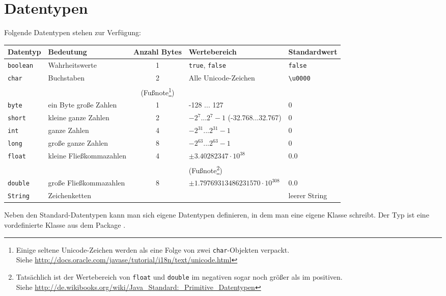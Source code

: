 \section{Datentypen}

Folgende Datentypen stehen zur Verfügung:

\begin{savenotes}
\begin{tabular}{|l|l|c|l|l|}\hline
\textbf{Datentyp} & \textbf{Bedeutung} & \textbf{Anzahl Bytes} &
\textbf{Wertebereich} & \textbf{Standardwert}
\\ \hline
{\lstinline|boolean|} & Wahrheitswerte & 1 & {\lstinline|true|},
{\lstinline|false|} & {\lstinline|false|} 
\\ \hline
{\lstinline|char|} & Buchstaben & 2 & Alle Unicode-Zeichen &
{\lstinline|\u0000|} 
\\
&&(Fußnote\footnote{Einige seltene Unicode-Zeichen werden als eine Folge von
zwei \texttt{char}-Objekten verpackt.\\ Siehe
\url{http://docs.oracle.com/javase/tutorial/i18n/text/unicode.html}})&&
\\
\hline {\lstinline|byte|} & ein Byte große Zahlen & 1 & -128 ... 127 & 0 
\\ \hline
{\lstinline|short|} & kleine ganze Zahlen & 2 & $-2^{7} ... 2^{7}-1$
(-32.768...32.767) & 0 \\ \hline
{\lstinline|int|} & ganze Zahlen & 4 & $-2^{31} ... 2^{31}-1$ & 0 
\\ \hline 
{\lstinline|long|} & große ganze Zahlen & 8 & $-2^{63} ... 2^{63}-1$ & 0
\\ \hline
{\lstinline|float|} & kleine Fließkommazahlen & 4 & $\pm 3.40282347 \cdot
10^{38}$ & 0.0 \\ 
&&& (Fußnote\footnote{Tatsächlich ist der Wertebereich von \texttt{float} und
\texttt{double} im negativen sogar noch größer als im positiven.\\ Siehe
\url{http://de.wikibooks.org/wiki/Java_Standard:_Primitive_Datentypen}})&
\\
\hline {\lstinline|double|} & große Fließkommazahlen & 8 & $\pm 1.79769313486231570
\cdot 10^{308}$ & 0.0
\\ \hline
{\lstinline|String|} & Zeichenketten & & & leerer String
\\ \hline
\end{tabular}
\end{savenotes}

Neben den Standard-Datentypen kann man sich eigene Datentypen definieren, in dem
man eine eigene Klasse schreibt. Der Typ  ist eine vordefinierte
Klasse aus dem Package .


